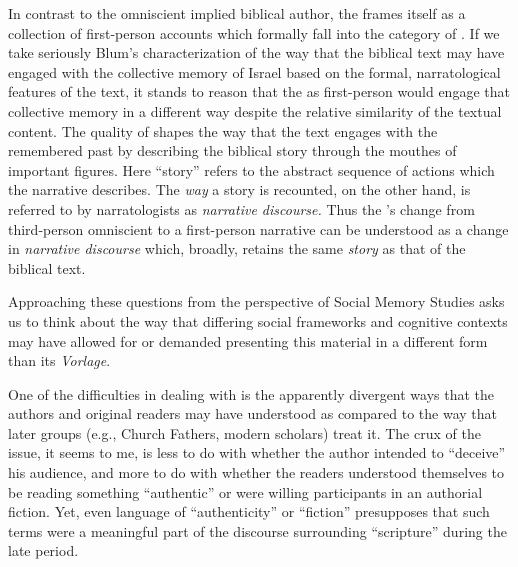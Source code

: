  In contrast to the omniscient implied biblical author, the \ga frames itself as a collection of first-person accounts which formally fall into the category of \psy. If we take seriously Blum's characterization of the way that the biblical text may have engaged with the collective memory of Israel based on the formal, narratological features of the text, it stands to reason that the \ga as first-person \psy would engage that collective memory in a different way despite the relative similarity of the textual content. The \psgraphic quality of \ga shapes the way that the text engages with the remembered past by describing the biblical story through the mouthes of important figures. Here ``story'' refers to the abstract sequence of actions which the narrative describes. The \emph{way} a story is recounted, on the other hand, is referred to by narratologists as \emph{narrative discourse.} Thus the \ga's change from third-person omniscient to a \psgraphical first-person narrative can be understood as a change in \emph{narrative discourse} which, broadly, retains the same \emph{story} as that of the biblical text.

 Approaching these questions from the perspective of Social Memory Studies asks us to think about the way that differing social frameworks and cognitive contexts may have allowed for or demanded presenting this material in a different form than its \emph{Vorlage}.

 One of the difficulties in dealing with \psy is the apparently divergent ways that the authors and original readers may have understood \psy as compared to the way that later groups (e.g., Church Fathers, modern scholars) treat it. The crux of the issue, it seems to me, is less to do with whether the author intended to ``deceive'' his audience, and more to do with whether the readers understood themselves to be reading something ``authentic'' or were willing participants in an authorial fiction. Yet, even language of ``authenticity'' or ``fiction'' presupposes that such terms were a meaningful part of the discourse surrounding ``scripture'' during the late \secondtemple period.